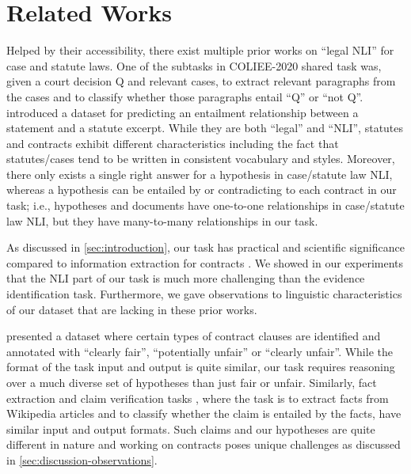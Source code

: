 \section{Related Works}

Helped by their accessibility, there exist multiple prior works on ``legal NLI'' for case and statute laws.
One of the subtasks in COLIEE-2020 shared task \cite{rabelo_coliee_nodate} was, given a court decision Q and relevant cases, to extract relevant paragraphs from the cases and to classify whether those paragraphs entail ``Q'' or ``not Q''.
\citet{holzenberger_dataset_2020} introduced a dataset for predicting an entailment relationship between a statement and a statute excerpt.
While they are both ``legal'' and ``NLI'', statutes and contracts exhibit different characteristics including the fact that statutes/cases tend to be written in consistent vocabulary and styles.
Moreover, there only exists a single right answer for a hypothesis in case/statute law NLI, whereas a hypothesis can be entailed by or contradicting to each contract in our task; i.e., hypotheses and documents have one-to-one relationships in case/statute law NLI, but they have many-to-many relationships in our task.

As discussed in \cref{sec:introduction}, our task has practical and scientific significance compared to information extraction for contracts \cite{leivaditi_benchmark_2020,hendrycks_cuad_2021}.
We showed in our experiments that the NLI part of our task is much more challenging than the evidence identification task.
Furthermore, we gave observations to linguistic characteristics of our dataset that are lacking in these prior works.

\citet{lippi_claudette_2019} presented a dataset where certain types of contract clauses are identified and annotated with ``clearly fair'', ``potentially unfair'' or ``clearly unfair''.
While the format of the task input and output is quite similar, our task requires reasoning over a much diverse set of hypotheses than just fair or unfair.
Similarly, fact extraction and claim verification tasks \cite{thorne_fever_2018,jiang_hover_2020}, where the task is to extract facts from Wikipedia articles and to classify whether the claim is entailed by the facts, have similar input and output formats.
Such claims and our hypotheses are quite different in nature and working on contracts poses unique challenges as discussed in \cref{sec:discussion-observations}.
